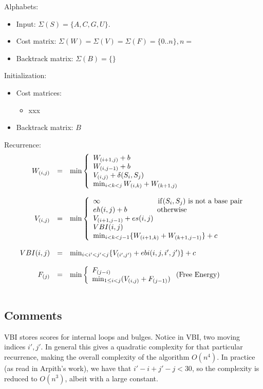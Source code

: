 \documentclass[11pt]{article}
\def\ul{\begin{itemize}}
\def\ule{\end{itemize}}
\begin{document}
Alphabets:\ul
\item Input: $\Sigma(S)=\{A,C,G,U\}$.
\item Cost matrix: $\Sigma(W)=\Sigma(V)=\Sigma(F)=\{0..n\},n=$
\item Backtrack matrix: $\Sigma(B)=\{\}$
\ule

Initialization:\ul
\item Cost matrices:\ul
	\item xxx
\ule
\item Backtrack matrix: $B$
\ule

Recurrence:
\[\begin{array}{rcl}
W_{(i,j)}&=&\min\left\{\begin{array}{l}
	W_{(i+1,j)}+b \\
	W_{(i,j-1)}+b \\
	V_{(i,j)}+\delta(S_i,S_j) \\
	\min_{i<k<j}W_{(i,k)}+W_{(k+1,j)}
\end{array}\right.\\\\

V_{(i,j)}&=&\min\left\{\begin{array}{ll}
	\infty \qquad\qquad\qquad\qquad {\rm if}(S_i,S_j) \text{ is not a base pair}\\
	eh(i,j)+b \qquad\qquad\, \text{otherwise} \\
	V_{(i+1,j-1)}+es(i,j) \\
	VBI(i,j) \\
	\min_{i<k<j-1}\{W_{(i+1,k)}+W_{(k+1,j-1)}\} +c
\end{array}\right.\\\\

VBI(i,j)&=&\min_{i<i'<j'<j}\{V_{(i',j')}+ebi(i,j,i',j')\} +c \\\\

F_{(j)}&=&\min\left\{\begin{array}{ll}
F_{(j-i)} \\
\min_{1\le i< j} (V_{(i,j)} + F_{(j-1)})
\end{array}\right. \text{(Free Energy)}\\\\

\end{array}\]

\subsection{Comments}

VBI stores scores for internal loops and bulges.
Notice in VBI, two moving indices $i', j'$. In general this gives a quadratic complexity for that particular recurrence, making the overall complexity of the algorithm $O(n^4)$. In practice (as read in Arpith's work), we have that $i' - i + j'- j < 30$, so the complexity is reduced to $O(n^3)$, albeit with a large constant.

\end{document}
